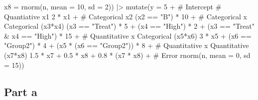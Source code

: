 \documentclass[
]{article}
\newenvironment{Shaded}{\begin{snugshade}}{\end{snugshade}}
\newcommand{\AttributeTok}[1]{\textcolor[rgb]{0.40,0.45,0.13}{#1}}
\newcommand{\CommentTok}[1]{\textcolor[rgb]{0.37,0.37,0.37}{#1}}
\newcommand{\DecValTok}[1]{\textcolor[rgb]{0.68,0.00,0.00}{#1}}
\newcommand{\FloatTok}[1]{\textcolor[rgb]{0.68,0.00,0.00}{#1}}
\newcommand{\FunctionTok}[1]{\textcolor[rgb]{0.28,0.35,0.67}{#1}}
\newcommand{\NormalTok}[1]{\textcolor[rgb]{0.00,0.23,0.31}{#1}}
\newcommand{\SpecialCharTok}[1]{\textcolor[rgb]{0.37,0.37,0.37}{#1}}
\newcommand{\StringTok}[1]{\textcolor[rgb]{0.13,0.47,0.30}{#1}}
\begin{document}
\begin{Shaded}
\begin{Highlighting}[numbers=left,,]
                 \AttributeTok{x8 =} \FunctionTok{rnorm}\NormalTok{(n, }\AttributeTok{mean =} \DecValTok{10}\NormalTok{, }\AttributeTok{sd =} \DecValTok{2}\NormalTok{)) }\SpecialCharTok{|\textgreater{}}
        \FunctionTok{mutate}\NormalTok{(}\AttributeTok{y =} \DecValTok{5} \SpecialCharTok{+}                          \CommentTok{\# Intercept}
                   \CommentTok{\# Quantiative x1}
                   \DecValTok{2} \SpecialCharTok{*}\NormalTok{ x1 }\SpecialCharTok{+}
                   \CommentTok{\# Categorical x2}
\NormalTok{                   (x2 }\SpecialCharTok{==} \StringTok{"B"}\NormalTok{) }\SpecialCharTok{*} \DecValTok{10} \SpecialCharTok{+}
                   \CommentTok{\# Categorical x Categorical (x3*x4)}
\NormalTok{                   (x3 }\SpecialCharTok{==} \StringTok{"Treat"}\NormalTok{) }\SpecialCharTok{*} \DecValTok{5} \SpecialCharTok{+}\NormalTok{ (x4 }\SpecialCharTok{==} \StringTok{"High"}\NormalTok{) }\SpecialCharTok{*} \DecValTok{2} \SpecialCharTok{+} 
\NormalTok{                   (x3 }\SpecialCharTok{==} \StringTok{"Treat"} \SpecialCharTok{\&}\NormalTok{ x4 }\SpecialCharTok{==} \StringTok{"High"}\NormalTok{) }\SpecialCharTok{*} \DecValTok{15} \SpecialCharTok{+}
                   \CommentTok{\# Quantitative x Categorical  (x5*x6)}
                   \DecValTok{3} \SpecialCharTok{*}\NormalTok{ x5 }\SpecialCharTok{+}\NormalTok{ (x6 }\SpecialCharTok{==} \StringTok{"Group2"}\NormalTok{) }\SpecialCharTok{*} \DecValTok{4} \SpecialCharTok{+} 
\NormalTok{                   (x5 }\SpecialCharTok{*}\NormalTok{ (x6 }\SpecialCharTok{==} \StringTok{"Group2"}\NormalTok{)) }\SpecialCharTok{*} \DecValTok{8} \SpecialCharTok{+} 
                   \CommentTok{\# Quantitative x Quantitative (x7*x8)}
                   \FloatTok{1.5} \SpecialCharTok{*}\NormalTok{ x7 }\SpecialCharTok{+} \FloatTok{0.5} \SpecialCharTok{*}\NormalTok{ x8 }\SpecialCharTok{+} 
                   \FloatTok{0.8} \SpecialCharTok{*}\NormalTok{ (x7 }\SpecialCharTok{*}\NormalTok{ x8) }\SpecialCharTok{+} 
                   \CommentTok{\# Error}
                   \FunctionTok{rnorm}\NormalTok{(n, }\AttributeTok{mean =} \DecValTok{0}\NormalTok{, }\AttributeTok{sd =} \DecValTok{15}\NormalTok{))}
\end{Highlighting}
\end{Shaded}

\normalsize

\subsection{Part a}\label{part-a}
\end{document}
